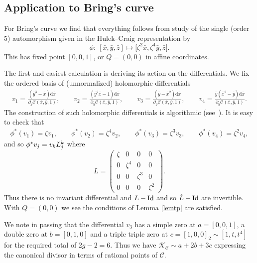 \documentclass[pdftex]{sigma}
\numberwithin{equation}{section}
\def\id{\mathop{\rm Id}\nolimits}
\newcommand{\dif}{\mathrm{d}}
\newcommand{\cx}{\bar{x}}
\newcommand{\cy}{\bar{y}}
\newcommand{\cz}{\bar{z}}
\begin{document}
\subsection{Application to Bring's curve}\label{section5.3}

For Bring's curve we f\/ind that everything follows
from  study of the single (order 5) automorphism given in the
Hulek--Craig representation by
\[
  \phi : \  [\cx,\cy,\cz] \mapsto \big[\zeta^2\cx, \zeta^4 \cy, \cz\big].
\]
This has f\/ixed point $[0,0,1]$, or $Q=(0,0)$ in af\/f\/ine coordinates.

The f\/irst and easiest calculation is deriving its action on the
dif\/ferentials. We f\/ix the ordered basis of (unnormalized) holomorphic
dif\/ferentials
\begin{gather*}
  v_1  = \frac{(\cy^3-\cx)\dif \cx}
    {\partial_y\mathcal{C}(\cx,\cy,1)}, \qquad
  v_2  = \frac{(\cy^2\cx-1)\dif \cx}
    {\partial_y\mathcal{C}(\cx,\cy,1)}, \qquad
  v_3  = \frac{(\cy-\cx^2)\dif \cx}
    {\partial_y\mathcal{C}(\cx,\cy,1)}, \qquad
  v_4  = \frac{\cy(\cx^2-\cy)\dif \cx}
    {\partial_y\mathcal{C}(\cx,\cy,1)}.
\end{gather*}
The construction of such holomorphic
dif\/ferentials is algorithmic (see~\cite{DvH}).
It is easy to check that
\begin{gather*}
  \phi^*(v_1)  = \zeta v_1, \qquad
  \phi^*(v_2)  = \zeta^4 v_2,  \qquad
  \phi^*(v_3)  = \zeta^3 v_3, \qquad
  \phi^*(v_4)  = \zeta^2 v_4,
\end{gather*}
and so $\phi\sp\ast v_j= v_k {L}\sp{k}_j$
where
\begin{equation*}
 {L} =
  \begin{pmatrix}
    \zeta & 0 & 0 & 0 \\
    0 & \zeta^4 & 0 & 0 \\
    0 & 0 & \zeta^3 & 0 \\
    0 & 0 & 0 & \zeta^2
  \end{pmatrix}.
\end{equation*}
Thus there is no invariant dif\/ferential and ${L}-\id$ and so $\hat{L}-\id$
are invertible. With $Q=(0,0)$ we see the conditions of Lemma \ref{lemtp} are
satisf\/ied.

We note in passing that the dif\/ferential $v_3$ has a simple zero at $a=[0,0,1]$, a double
zero at $b=[0,1,0]$ and a triple triple zero at $c=[1,0,0]_2 \sim [1,t,t^4]$ for the required
total of $2g-2 = 6$. Thus we have $\mathcal{K}_\mathcal{C}\sim a+2b+3c$ expressing the
canonical divisor in terms of rational points of $\mathcal{C}$.
\end{document}
